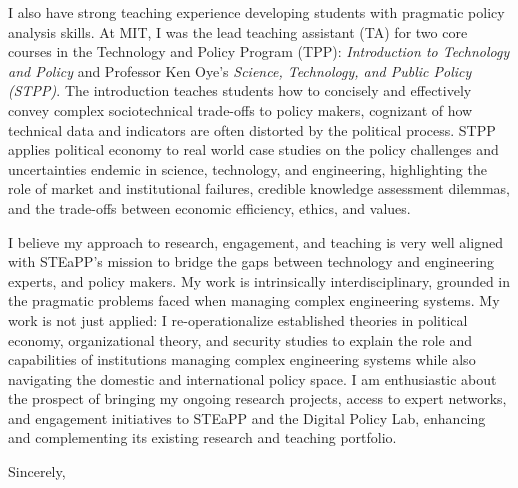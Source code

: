 \documentclass[11pt]{letter}
\begin{document}
\begin{letter}
I also have strong teaching experience developing students with pragmatic
policy analysis skills. 
%
At MIT, I was the lead teaching assistant (TA)
for two core courses in the Technology and Policy Program (TPP):
\emph{Introduction to Technology and Policy} and Professor Ken Oye's \emph{Science,
Technology, and Public Policy (STPP)}. 
%
The introduction teaches
students how to concisely and effectively convey complex
sociotechnical trade-offs to policy makers, cognizant of how technical
data and indicators are often distorted by the political process. 
%
STPP applies political economy to real world case studies on the policy
challenges and uncertainties endemic in science, technology, and
engineering, highlighting the role of market and institutional
failures, credible knowledge assessment dilemmas, and the trade-offs
between economic efficiency, ethics, and values.


I believe my approach to research, engagement, and teaching is very
well aligned with 
STEaPP's mission to bridge the gaps between technology and engineering
experts, and policy makers. 
%
My work is intrinsically interdisciplinary, grounded
in the  pragmatic problems faced when managing complex engineering systems.
%
My work is not just applied: I 
re-operationalize established theories in political economy,
organizational theory, and security studies to explain the role and
capabilities of institutions managing complex engineering systems
while also navigating the domestic and international policy space.
%
I am enthusiastic about the prospect of bringing my ongoing
research projects, access to expert networks, and engagement
initiatives to STEaPP and the Digital Policy Lab, enhancing and complementing its existing
research and teaching portfolio.
%


\closing{Sincerely,}



\end{letter}
\end{document}
